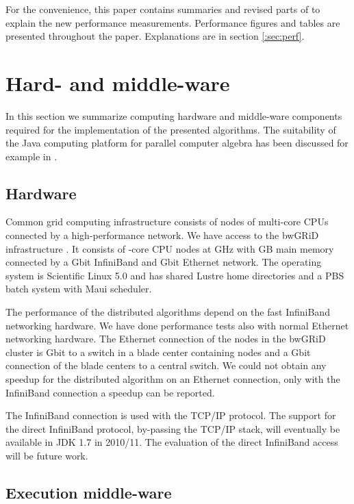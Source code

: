 \documentclass[10pt,twocolumn,a4paper]{article}
\begin{document}
For the convenience, this paper contains summaries and revised parts
of \cite{Kredel:2009,Kredel:2010} to explain the new performance
measurements.  Performance figures and tables are presented throughout
the paper.  Explanations are in section \ref{:sec:perf}.


\section{Hard- and middle-ware} 

In this section we summarize computing hardware and middle-ware
components required for the implementation of the presented
algorithms.  The suitability of the Java computing platform for
parallel computer algebra has been discussed for example in
\cite{Kredel:2009,Kredel:2010}.  


\subsection{Hardware} \label{sec:hardware}

Common grid computing infrastructure consists of nodes of multi-core
CPUs connected by a high-performance network. We have access to the
bwGRiD infrastructure \cite{bwgrid:2008}.
It consists of  -core CPU nodes
at  GHz with  GB main memory connected by a  Gbit InfiniBand and
 Gbit Ethernet network.  The operating system is Scientific Linux 5.0
and has shared Lustre home directories and a PBS batch system with
Maui scheduler.

The performance of the distributed algorithms depend on the fast
Infini\-Band networking hard\-ware. We have done performance tests
also with normal Ether\-net networking hard\-ware.  The Ethernet
connection of the nodes in the bw\-GRiD cluster is  Gbit to a
switch in a blade center containing  nodes and a  Gbit
connection of the blade centers to a central switch.  We could not
obtain any speedup for the distributed algorithm on an Ether\-net
connection, only with the Infini\-Band connection a speedup can be
reported.

The Infini\-Band connection is used with the TCP/IP protocol. The
support for the direct Infini\-Band protocol, by-passing the TCP/IP
stack, will eventually be available in JDK 1.7 in 2010/11. The evaluation
of the direct Infini\-Band access will be future work.


\subsection{Execution middle-ware} 
\end{document}

